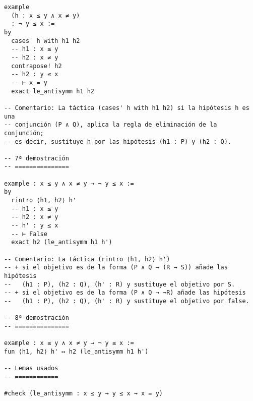 \begin{verbatim}
example
  (h : x ≤ y ∧ x ≠ y)
  : ¬ y ≤ x :=
by
  cases' h with h1 h2
  -- h1 : x ≤ y
  -- h2 : x ≠ y
  contrapose! h2
  -- h2 : y ≤ x
  -- ⊢ x = y
  exact le_antisymm h1 h2

-- Comentario: La táctica (cases' h with h1 h2) si la hipótesis h es una
-- conjunción (P ∧ Q), aplica la regla de eliminación de la conjunción;
-- es decir, sustituye h por las hipótesis (h1 : P) y (h2 : Q).

-- 7ª demostración
-- ===============

example : x ≤ y ∧ x ≠ y → ¬ y ≤ x :=
by
  rintro ⟨h1, h2⟩ h'
  -- h1 : x ≤ y
  -- h2 : x ≠ y
  -- h' : y ≤ x
  -- ⊢ False
  exact h2 (le_antisymm h1 h')

-- Comentario: La táctica (rintro ⟨h1, h2⟩ h')
-- + si el objetivo es de la forma (P ∧ Q → (R → S)) añade las hipótesis
--   (h1 : P), (h2 : Q), (h' : R) y sustituye el objetivo por S.
-- + si el objetivo es de la forma (P ∧ Q → ¬R) añade las hipótesis
--   (h1 : P), (h2 : Q), (h' : R) y sustituye el objetivo por false.

-- 8ª demostración
-- ===============

example : x ≤ y ∧ x ≠ y → ¬ y ≤ x :=
fun ⟨h1, h2⟩ h' ↦ h2 (le_antisymm h1 h')

-- Lemas usados
-- ============

#check (le_antisymm : x ≤ y → y ≤ x → x = y)
\end{verbatim}

